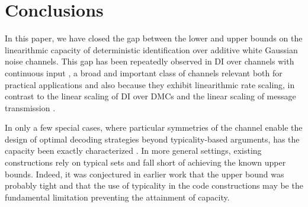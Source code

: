 \documentclass[10pt,conference]{IEEEtran}
\newcommand{\1}{\mathds{1}}
\newcommand{\pau}[1]{{\color{purple}#1}}
\begin{document}

\section{Conclusions}\label{sec:conclusions}
In this paper, we have closed the gap between the lower and upper bounds on the linearithmic capacity of deterministic identification over additive white Gaussian noise channels. This gap has been repeatedly observed in DI over channels with continuous input \cite{CDBW:DI_classical, DI-fading}, a broad and important class of channels relevant both for practical applications \cite{DI-poisson_mc, 6G_Book, 6G_Book_2} and also because they exhibit linearithmic rate scaling, in contrast to the linear scaling of DI over DMCs \cite{SPBD:DI_power} and the linear scaling of message transmission \cite{Shannon:TheoryCommunication}.

In only a few special cases, where particular symmetries of the channel enable the design of optimal decoding strategies beyond typicality-based arguments, has the capacity been exactly characterized \cite{CDBW:DI_classical, qhtl_ISIT}. In more general settings, existing constructions rely on typical sets and fall short of achieving the known upper bounds. Indeed, it was conjectured in earlier work that the upper bound was probably tight and that the use of typicality in the code constructions may be the fundamental limitation preventing the attainment of capacity.
\end{document}
